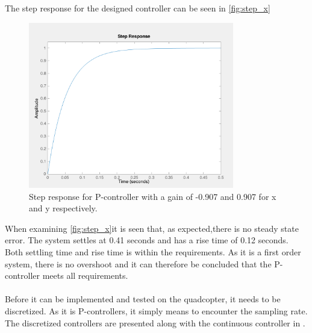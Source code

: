 The step response for the designed controller can be seen in \autoref{fig:step_x}
\begin{figure}[H]
	\centering
	\includegraphics[width=0.8\textwidth]{figures/step_x.png}
	\caption{Step response for P-controller with a gain of -0.907 and 0.907 for x and y respectively.}\label{fig:step_x}
\end{figure}
When examining \autoref{fig:step_x}it is seen that, as expected,there is no steady state error. The system settles at 0.41 seconds and has a rise time of 0.12 seconds. Both settling time and rise time is within the requirements. As it is a first order system, there is no overshoot and it can therefore be concluded that the P-controller meets all requirements.
\\
\\
Before it can be implemented and tested on the quadcopter, it needs to be discretized. As it is P-controllers, it simply means to encounter the sampling rate. The discretized controllers are presented along with the continuous controller in .
\\ \\
  

% 




